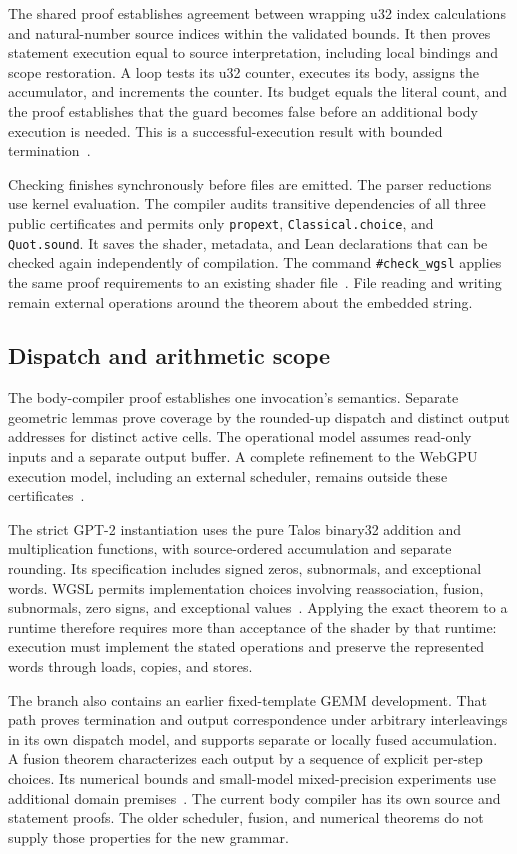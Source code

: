 \documentclass[11pt]{article}
\newcommand{\code}[1]{\texttt{#1}}
\begin{document}
The shared proof establishes agreement between wrapping u32 index calculations and natural-number source indices within the validated bounds.  It then proves statement execution equal to source interpretation, including local bindings and scope restoration.  A loop tests its u32 counter, executes its body, assigns the accumulator, and increments the counter.  Its budget equals the literal count, and the proof establishes that the guard becomes false before an additional body execution is needed.  This is a successful-execution result with bounded termination~\cite{execution}.

Checking finishes synchronously before files are emitted.  The parser reductions use kernel evaluation.  The compiler audits transitive dependencies of all three public certificates and permits only \code{propext}, \code{Classical.choice}, and \code{Quot.sound}.  It saves the shader, metadata, and Lean declarations that can be checked again independently of compilation.  The command \code{\#check\_wgsl} applies the same proof requirements to an existing shader file~\cite{compiler}.  File reading and writing remain external operations around the theorem about the embedded string.

\subsection{Dispatch and arithmetic scope}

The body-compiler proof establishes one invocation's semantics.  Separate geometric lemmas prove coverage by the rounded-up dispatch and distinct output addresses for distinct active cells.  The operational model assumes read-only inputs and a separate output buffer.  A complete refinement to the WebGPU execution model, including an external scheduler, remains outside these certificates~\cite{execution}.

The strict GPT-2 instantiation uses the pure Talos binary32 addition and multiplication functions, with source-ordered accumulation and separate rounding.  Its specification includes signed zeros, subnormals, and exceptional words.  WGSL permits implementation choices involving reassociation, fusion, subnormals, zero signs, and exceptional values~\cite{wgsl}.  Applying the exact theorem to a runtime therefore requires more than acceptance of the shader by that runtime: execution must implement the stated operations and preserve the represented words through loads, copies, and stores.

The branch also contains an earlier fixed-template GEMM development.  That path proves termination and output correspondence under arbitrary interleavings in its own dispatch model, and supports separate or locally fused accumulation.  A fusion theorem characterizes each output by a sequence of explicit per-step choices.  Its numerical bounds and small-model mixed-precision experiments use additional domain premises~\cite{legacy}.  The current body compiler has its own source and statement proofs.  The older scheduler, fusion, and numerical theorems do not supply those properties for the new grammar.
\end{document}
